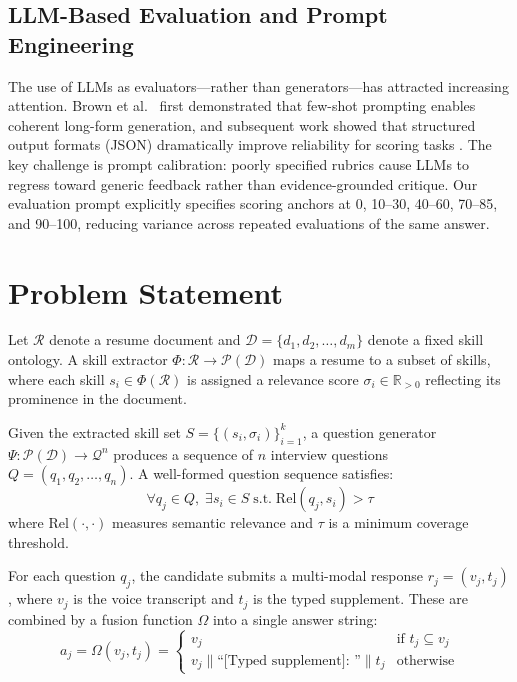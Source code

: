 \documentclass[conference]{IEEEtran}
\begin{document}
\subsection{LLM-Based Evaluation and Prompt Engineering}

The use of LLMs as evaluators—rather than generators—has attracted increasing attention. Brown et al.\ \cite{brown2020gpt3} first demonstrated that few-shot prompting enables coherent long-form generation, and subsequent work showed that structured output formats (JSON) dramatically improve reliability for scoring tasks \cite{openai2023gpt4}. The key challenge is prompt calibration: poorly specified rubrics cause LLMs to regress toward generic feedback rather than evidence-grounded critique. Our evaluation prompt explicitly specifies scoring anchors at 0, 10--30, 40--60, 70--85, and 90--100, reducing variance across repeated evaluations of the same answer.

\section{Problem Statement}
\label{sec:problem}

Let $\mathcal{R}$ denote a resume document and $\mathcal{D} = \{d_1, d_2, \ldots, d_m\}$ denote a fixed skill ontology. A skill extractor $\Phi: \mathcal{R} \rightarrow \mathcal{P}(\mathcal{D})$ maps a resume to a subset of skills, where each skill $s_i \in \Phi(\mathcal{R})$ is assigned a relevance score $\sigma_i \in \mathbb{R}_{>0}$ reflecting its prominence in the document.

Given the extracted skill set $S = \{(s_i, \sigma_i)\}_{i=1}^{k}$, a question generator $\Psi: \mathcal{P}(\mathcal{D}) \rightarrow \mathcal{Q}^n$ produces a sequence of $n$ interview questions $Q = (q_1, q_2, \ldots, q_n)$. A well-formed question sequence satisfies:
\begin{equation}
    \forall q_j \in Q, \; \exists s_i \in S \; \text{s.t.} \; \text{Rel}(q_j, s_i) > \tau
    \label{eq:coverage}
\end{equation}
where $\text{Rel}(\cdot, \cdot)$ measures semantic relevance and $\tau$ is a minimum coverage threshold.

For each question $q_j$, the candidate submits a multi-modal response $r_j = (v_j, t_j)$, where $v_j$ is the voice transcript and $t_j$ is the typed supplement. These are combined by a fusion function $\Omega$ into a single answer string:
\begin{equation}
    a_j = \Omega(v_j, t_j) = \begin{cases} v_j & \text{if } t_j \subseteq v_j \\ v_j \| \text{``[Typed supplement]: ''} \| t_j & \text{otherwise} \end{cases}
    \label{eq:fusion}
\end{equation}
\end{document}
